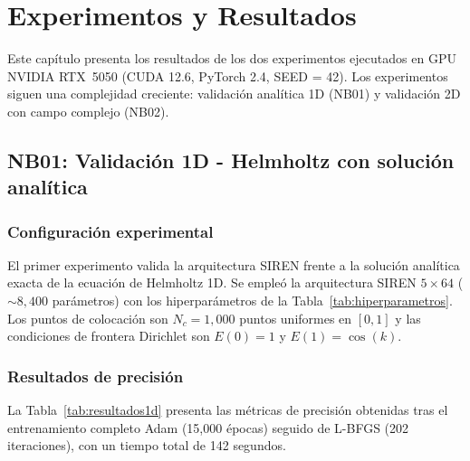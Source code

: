 \chapter{Experimentos y Resultados}\label{cap4:resultados}

Este capítulo presenta los resultados de los dos experimentos ejecutados en GPU
NVIDIA RTX~5050 (CUDA 12.6, PyTorch 2.4, SEED = 42). Los experimentos siguen
una complejidad creciente: validación analítica 1D (NB01) y validación 2D con
campo complejo (NB02).

\section{NB01: Validación 1D - Helmholtz con solución analítica}
\label{sec:resultados1d}

\subsection{Configuración experimental}

El primer experimento valida la arquitectura SIREN frente a la solución analítica
exacta de la ecuación de Helmholtz 1D. Se empleó la arquitectura SIREN
$5 \times 64$ (${\sim}8{,}400$ parámetros) con los hiperparámetros de la
Tabla~\ref{tab:hiperparametros}. Los puntos de colocación son $N_c = 1{,}000$
puntos uniformes en $[0,1]$ y las condiciones de frontera Dirichlet son
$E(0) = 1$ y $E(1) = \cos(k)$.

\subsection{Resultados de precisión}

La Tabla~\ref{tab:resultados1d} presenta las métricas de precisión obtenidas
tras el entrenamiento completo Adam (15{,}000 épocas) seguido de L-BFGS
(202 iteraciones), con un tiempo total de 142 segundos.

